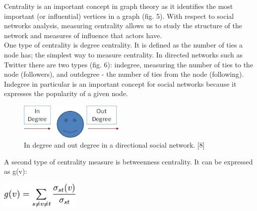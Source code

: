 \documentclass[conference,letterpaper]{IEEEtran}
\begin{document}
\indent
Centrality is an important concept in graph theory as it identifies the most important (or influential) vertices in a graph (fig. 5). With respect to social networks analysis, measuring centrality allows us to study the structure of the network and measures of influence that actors have.\\

One type of centrality is degree centrality. It is defined as the number of ties a node has; the simplest way to measure centrality. In directed networks such as Twitter there are two types (fig. 6): indegree, measuring the number of ties to the node (followers), and outdegree - the number of ties from the node (following). Indegree in particular is an important concept for social networks because it expresses the popularity of a given node. \\
\begin{center}
\begin{figure}[hb]
\centering
\includegraphics[width=2.0in]{degree_centrality}
\caption{
In degree and out degree in a directional social network. [8]
}
\label{fig_sim}
\end{figure}
\end{center}

\indent
A second type of centrality measure is betweenness centrality. It can be expressed as g(v):

\centerline{
  \includegraphics[width=1.5in]{betweenness_centrality.png}
}
\end{document}
